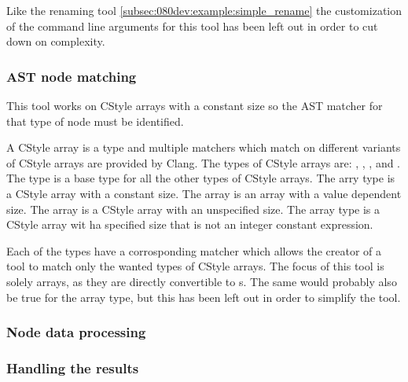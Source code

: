 Like the renaming tool \cref{subsec:080dev:example:simple_rename} the customization of the command line arguments for this tool has been left out in order to cut down on complexity.

\subsubsection*{AST node matching}

This tool works on CStyle arrays with a constant size so the AST matcher for that type of node must be identified.

A CStyle array is a type and multiple matchers which match on different variants of CStyle arrays are provided by Clang. The types of CStyle arrays are: , , ,  and . \\
The  type is a base type for all the other types of CStyle arrays. The  arry type is a CStyle array with a constant size. The  array is an array with a value dependent size. The  array is a CStyle array with an unspecified size. The  array type is a CStyle array wit ha specified size that is not an integer constant expression.

Each of the types have a corrosponding matcher which allows the creator of a tool to match only the wanted types of CStyle arrays. The focus of this tool is solely  arrays, as they are directly convertible to s. The same would probably also be true for the  array type, but this has been left out in order to simplify the tool.




\subsubsection*{Node data processing}



\subsubsection*{Handling the results}


